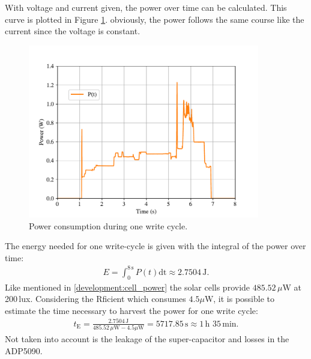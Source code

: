 \newpage
With voltage and current given, the power over time can be calculated.
This curve is plotted in Figure \ref{results:p}.
obviously, the power follows the same course like the current since the voltage is constant.
\begin{figure}[ht]
	\centering
	\includegraphics[width=0.9\textwidth]{5-results/energy/logger/p.pdf}
	\caption{Power consumption during one write cycle.\label{results:p}}
\end{figure}
The energy needed for one write-cycle is given with the integral of the power over time:
\begin{align}
	E = \int_{0}^{8\,\text{s}}P(t)\text{dt}\approx 2.7504\,\text{J}\label{result:energy}.
\end{align}
Like mentioned in \eqref{development:cell_power} the solar cells provide $485.52\,\mu \text{W}$ at 200\,lux.
Considering the Rficient which consumes $4.5\mu \text{W}$, it is possible to estimate the time necessary to harvest the power for one write cycle:
\begin{align}
	t_{\text{E}}=\frac{2.7504\,\text{J}}{485.52\,\mu \text{W}-4.5\mu \text{W}}=5717.85\,\text{s}\approx 1\,\text{h } 35\,\text{min}.
\end{align}
Not taken into account is the leakage of the super-capacitor and losses in the ADP5090.

\clearpage
